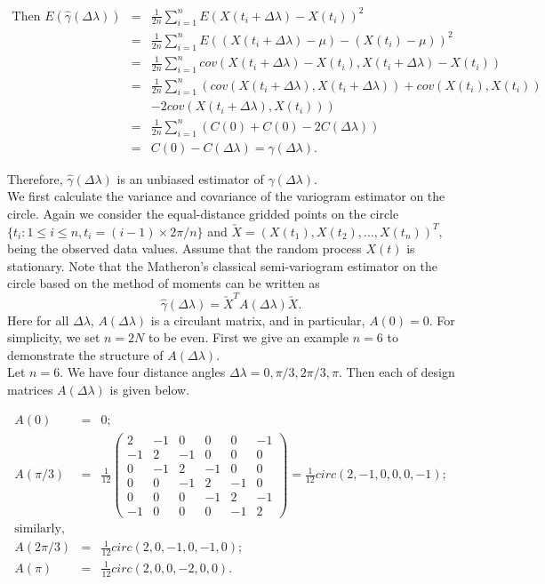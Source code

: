 \begin{eqnarray*}
\mbox{Then } E(\hat{\gamma}(\Delta \lambda)) &=& \frac{1}{2n} \sum_{i = 1}^n E(X(t_i + \Delta \lambda) - X(t_i))^2 \\
&=& \frac{1}{2n} \sum_{i = 1}^n E((X(t_i + \Delta \lambda)-\mu) - (X(t_i) - \mu))^2 \\
&=& \frac{1}{2n} \sum_{i = 1}^n cov(X(t_i + \Delta \lambda) - X(t_i), X(t_i + \Delta \lambda) - X(t_i)) \\
&=& \frac{1}{2n} \sum_{i = 1}^n \left(cov(X(t_i + \Delta \lambda), X(t_i + \Delta \lambda)) + cov(X(t_i), X(t_i))\right. \\
& & - \left. 2cov(X(t_i + \Delta \lambda), X(t_i)) \right)\\
&=& \frac{1}{2n} \sum_{i = 1}^n \left( C(0) + C(0) - 2C(\Delta \lambda)\right) \\
&=& C(0) - C(\Delta \lambda) = \gamma(\Delta \lambda).
\end{eqnarray*}

Therefore, $\hat{\gamma}(\Delta \lambda)$ is an unbiased estimator of $\gamma(\Delta \lambda)$. \\

We first calculate the variance and covariance of the variogram estimator on the circle. Again we consider the equal-distance gridded points on the circle $\{t_i: 1 \le i \le n, t_i = (i-1) \times 2\pi/n\}$ and $\utilde{X} = (X(t_1), X(t_2), \ldots, X(t_n))^T,$ being the observed data values. Assume that the random process $X(t)$ is stationary. Note that the Matheron's classical semi-variogram estimator on the circle based on the method of moments can be written as
\[
\hat{\gamma}(\Delta \lambda) = \utilde{X}^T A(\Delta \lambda)\utilde{X}.
\]
Here for all $\Delta \lambda$, $A(\Delta \lambda)$ is a circulant matrix, and in particular, $A(0)= 0$. For simplicity, we set $n = 2N$ to be even. First we give an example $n = 6$ to demonstrate the structure of $A(\Delta \lambda)$. \\

Let $n = 6$. We have four distance angles $\Delta \lambda = 0, \pi/3, 2\pi/3, \pi$. Then each of design matrices $A(\Delta \lambda)$ is given below.

\begin{eqnarray*}
A(0) &=& 0 ;  \\
A(\pi/3) &=& \frac{1}{12} \left(\begin{array}{cccccc}
2  &  -1 & 0  & 0 & 0 & -1 \\
-1 &  2  & -1 & 0 & 0 & 0   \\
0  & -1  & 2  & -1 & 0  & 0 \\
0  & 0   & -1 & 2  & -1 & 0 \\
0  & 0   &  0 & -1 & 2  & -1 \\
-1 & 0   &  0 &  0 & -1 & 2
\end{array}
\right) = \frac{1}{12} circ(2, -1, 0, 0, 0, -1);\\
\mbox{similarly}, \\
A(2\pi/3) &=&  \frac{1}{12} circ(2, 0, -1, 0, -1, 0);\\
A(\pi) &=& \frac{1}{12} circ(2, 0, 0, -2, 0, 0).
\end{eqnarray*}

